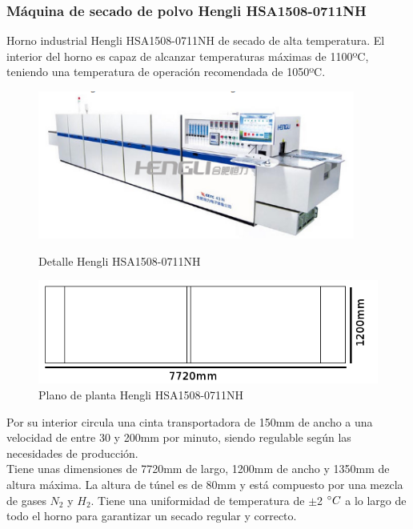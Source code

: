 \pagebreak

	\subsubsection{Máquina de secado de polvo Hengli HSA1508-0711NH}

	

	Horno industrial Hengli HSA1508-0711NH de secado de alta temperatura. El interior del horno es capaz de alcanzar temperaturas máximas de 1100ºC, teniendo una temperatura de operación recomendada de 1050ºC.\\

	
	\begin{figure}[htp]
		\begin{minipage}{.48\textwidth}
			\centering
			\includegraphics[scale=0.5]{Datasheets/1HornoFoto.png}
			\caption{Detalle Hengli HSA1508-0711NH}
			\label{fig:testa}
		\end{minipage}
		\begin{minipage}{.48\textwidth}
			\centering
			\includegraphics[scale=0.5]{Datasheets/Miniaturas/horno.png}
			\caption{Plano de planta Hengli HSA1508-0711NH}
			\label{fig:testb}
		\end{minipage}
	\end{figure}

	Por su interior circula una cinta transportadora de 150mm de ancho a una velocidad de entre 30 y 200mm por minuto, siendo regulable según las necesidades de producción.\\

	Tiene unas dimensiones de 7720mm de largo, 1200mm de ancho y 1350mm de altura máxima. La altura de túnel es de 80mm y está compuesto por una mezcla de gases $N_2$ y $H_2$. Tiene una uniformidad de temperatura de $\pm$2 $\degree C$ a lo largo de todo el horno para garantizar un secado regular y correcto.\\

